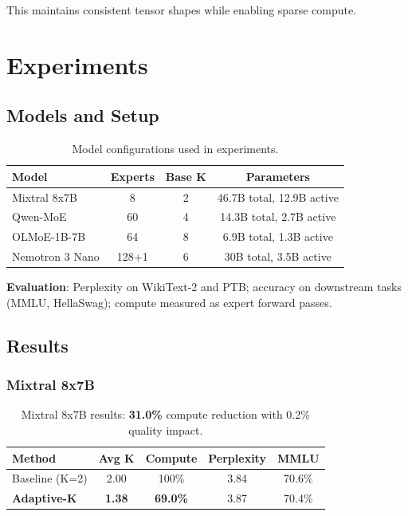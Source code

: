 \documentclass{article}
\begin{document}
This maintains consistent tensor shapes while enabling sparse compute.

\section{Experiments}

\subsection{Models and Setup}

\begin{table}[h]
\centering
\begin{tabular}{lccc}
\toprule
\textbf{Model} & \textbf{Experts} & \textbf{Base K} & \textbf{Parameters} \\
\midrule
Mixtral 8x7B & 8 & 2 & 46.7B total, 12.9B active \\
Qwen-MoE & 60 & 4 & 14.3B total, 2.7B active \\
OLMoE-1B-7B & 64 & 8 & 6.9B total, 1.3B active \\
Nemotron 3 Nano & 128+1 & 6 & 30B total, 3.5B active \\
\bottomrule
\end{tabular}
\caption{Model configurations used in experiments.}
\label{tab:models}
\end{table}

\textbf{Evaluation}: Perplexity on WikiText-2 and PTB; accuracy on downstream tasks (MMLU, HellaSwag); compute measured as expert forward passes.

\subsection{Results}

\subsubsection{Mixtral 8x7B}

\begin{table}[h]
\centering
\begin{tabular}{lcccc}
\toprule
\textbf{Method} & \textbf{Avg K} & \textbf{Compute} & \textbf{Perplexity} & \textbf{MMLU} \\
\midrule
Baseline (K=2) & 2.00 & 100\% & 3.84 & 70.6\% \\
\textbf{Adaptive-K} & \textbf{1.38} & \textbf{69.0\%} & 3.87 & 70.4\% \\
\bottomrule
\end{tabular}
\caption{Mixtral 8x7B results: \textbf{31.0\%} compute reduction with 0.2\% quality impact.}
\label{tab:mixtral}
\end{table}
\end{document}

